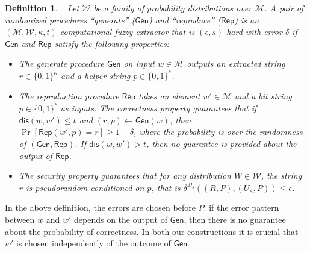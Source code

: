 \documentclass[11pt]{article}
\newcommand{\class}[1]{{\ensuremath{\mathsf{#1}}}}
\newcommand{\gen}{\ensuremath{\class{Gen}}\xspace}
\newcommand{\rep}{\ensuremath{\class{Rep}}\xspace}
\newcommand{\dis}{\ensuremath{\mathsf{dis}}}
\newtheorem{definition}[theorem]{Definition}
\begin{document}
\begin{definition}~\cite[Definition 2.5]{fuller2013computational}
\label{def:comp fuzzy extractor}
Let $\mathcal{W}$ be a family of probability distributions over $\mathcal{M}$. A pair of randomized procedures ``generate'' ($\gen$) and ``reproduce'' ($\rep$) is an $(\mathcal{M}, \mathcal{W}, \kappa, t)$-\emph{computational fuzzy extractor} that is $(\epsilon, s)$-hard with error $\delta$ if \gen and \rep satisfy the following properties:
\begin{itemize}
\item The generate procedure \gen on input $w\in \mathcal{M}$ outputs an extracted string $r\in\{0,1\}^\kappa$ and a helper string $p\in\{0,1\}^*$.
\item The reproduction procedure \rep takes an element $w'\in\mathcal{M}$ and a bit string $p\in\{0,1\}^*$ as inputs.  The \emph{correctness} property guarantees that if $\dis(w, w')\leq t$ and $(r, p)\leftarrow \gen(w)$, then $\Pr[\rep( w', p) = r] \geq 1-\delta$, where the probability is over the randomness of $(\gen, \rep)$.
If $\dis(w, w') > t$, then no guarantee is provided about the output of \rep.
\item The \emph{security} property guarantees that for any distribution $W\in \mathcal{W}$, the string $r$ is pseudorandom conditioned on $p$, that is $\delta^{\mathcal{D}_s}((R, P), (U_\kappa, P))\leq \epsilon$.
\end{itemize}
\end{definition}
In the above definition, the errors are chosen before $P$: if the error pattern between $w$ and $w'$ depends on the output of $\gen$, then there is no guarantee about the probability of correctness. In both our constructions it is crucial that $w'$ is chosen independently of the outcome of \gen.
\end{document}
